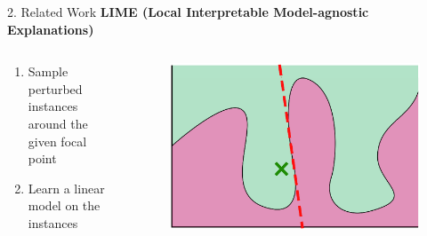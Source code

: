 \documentclass[unicode]{beamer}
\begin{document}
\begin{frame}
\begin{columns}[t]
\begin{column}{\lcol\linewidth}
			\vspace{-0.6em}
			\begin{block}{2. Related Work}
				\hspace{-1.0em}
				\textbf{LIME \small(Local Interpretable Model-agnostic Explanations)}\cite{ribeiro2016why}
				\vspace{-0.6em}
				\begin{columns}
					\begin{column}{.55\textwidth}
						{
							\renewcommand{\leftmargini}{2.5em}
							\begin{enumerate}
								\item Sample perturbed instances around the given focal point
								\item Learn a linear model on the instances
							\end{enumerate}
						}
					\end{column}
					\begin{column}{.45\textwidth}
						\begin{figure}
							\centering
							\includegraphics[width=.8\textwidth]{src/img/visual-lime}
						\end{figure}
					\end{column}
				\end{columns}


\end{block}
\end{column}
\end{columns}
\end{frame}
\end{document}
